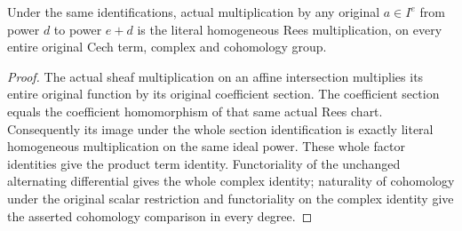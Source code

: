 \begin{lemma}
\label{lem:fibre-ideal-power-cech-multiplication-comparison}
\leanok
Under the same identifications, actual multiplication by any original
$a\in I^e$ from power $d$ to power $e+d$ is the literal homogeneous
Rees multiplication, on every entire original Cech term, complex and
cohomology group.
\end{lemma}
\begin{proof}
The actual sheaf multiplication on an affine intersection multiplies
its entire original function by its original coefficient section. The
coefficient section equals the coefficient homomorphism of that same
actual Rees chart. Consequently its image under the whole section
identification is exactly literal homogeneous multiplication on the
same ideal power. These whole factor identities give the product term
identity. Functoriality of the unchanged alternating differential gives
the whole complex identity; naturality of cohomology under the original
scalar restriction and functoriality on the complex identity give the
asserted cohomology comparison in every degree.
\end{proof}
